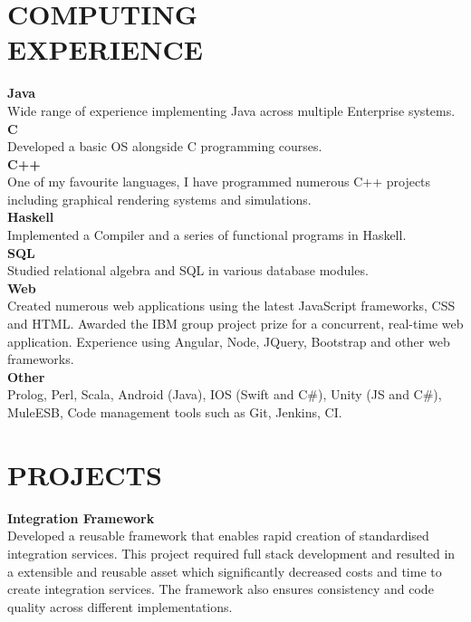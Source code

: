 \documentclass[margin, 10pt]{res} %
\begin{document}
\begin{resume}
\section{COMPUTING \\ EXPERIENCE} 

\textbf{Java} \\
Wide range of experience implementing Java across multiple Enterprise systems. \\
\textbf{C} \\
Developed a basic OS alongside C programming courses. \\
\textbf{C++} \\
One of my favourite languages, I have programmed numerous C++ projects including graphical rendering systems and simulations. \\
\textbf{Haskell} \\
Implemented a Compiler and a series of functional programs in Haskell. \\
\textbf{SQL} \\
Studied relational algebra and SQL in various database modules. \\
\textbf{Web} \\
Created numerous web applications using the latest JavaScript frameworks, CSS and HTML. Awarded the IBM group project prize for a concurrent, real-time web application. Experience using Angular, Node, JQuery, Bootstrap and other web frameworks. \\
\textbf{Other} \\
Prolog, Perl, Scala, Android (Java), IOS (Swift and C\#), Unity (JS and C\#), MuleESB, Code management tools such as Git, Jenkins, CI. 

\newpage


\section{PROJECTS}

\textbf{Integration Framework} \\
Developed a reusable framework that enables rapid creation of standardised integration services. This project required full stack development and resulted in a extensible and reusable asset which significantly decreased costs and time to create integration services. The framework also ensures consistency and code quality across different implementations.


\end{resume}
\end{document}
